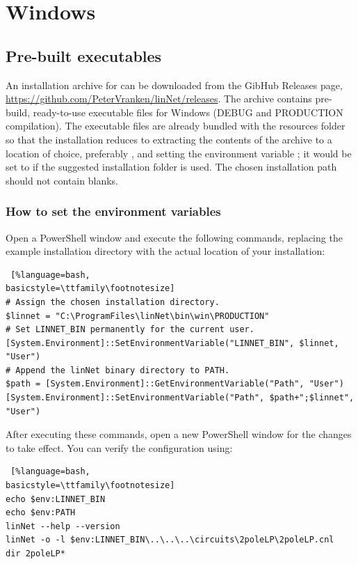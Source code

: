 \section{Windows}

\subsection{Pre-built executables}

An installation archive for \linnet{} can be downloaded from the GibHub
Releases page,
\href{https://github.com/PeterVranken/linNet/releases}{https://\-github.com/\-Peter\-Vranken/\-linNet/\-re\-leases}.
The archive contains pre-build, ready-to-use executable files for Windows
(DEBUG and PRODUCTION compilation). The executable files are already
bundled with the resources folder  so that the installation
reduces to extracting the contents of the archive to a location of choice,
preferably , and setting the environment
variable ; it would be set to
if the suggested installation folder is used. The chosen installation path
should not contain blanks.

\subsubsection{How to set the environment variables}

Open a PowerShell window and execute the following commands, replacing the
example installation directory with the actual location of your \linnet{}
installation: 

\begin{lstlisting} [%language=bash,
basicstyle=\ttfamily\footnotesize]
# Assign the chosen installation directory.
$linnet = "C:\ProgramFiles\linNet\bin\win\PRODUCTION"
# Set LINNET_BIN permanently for the current user.
[System.Environment]::SetEnvironmentVariable("LINNET_BIN", $linnet, "User")
# Append the linNet binary directory to PATH.
$path = [System.Environment]::GetEnvironmentVariable("Path", "User")
[System.Environment]::SetEnvironmentVariable("Path", $path+";$linnet", "User")
\end{lstlisting}

After executing these commands, open a new PowerShell window for the
changes to take effect. You can verify the configuration using:

\begin{lstlisting} [%language=bash,
basicstyle=\ttfamily\footnotesize]
echo $env:LINNET_BIN
echo $env:PATH
linNet --help --version
linNet -o -l $env:LINNET_BIN\..\..\..\circuits\2poleLP\2poleLP.cnl
dir 2poleLP*
\end{lstlisting}

